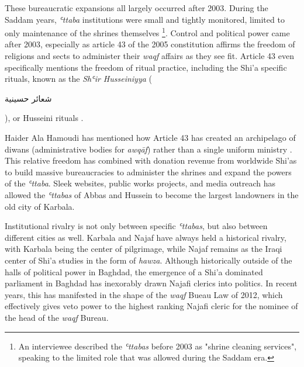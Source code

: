 These bureaucratic expansions all largely occurred after 2003. During the Saddam years, \emph{ʿttaba} institutions were small and tightly monitored, limited to only maintenance of the shrines themselves \footnote{An interviewee described the \emph{ʿttabas} before 2003 as "shrine cleaning services", speaking to the limited role that was allowed during the Saddam era.}. Control and political power came after 2003, especially as article 43 of the 2005 constitution affirms the freedom of religions and sects to administer their \emph{waqf} affairs as they see fit. Article 43 even specifically mentions the freedom of ritual practice, including the Shi'a specific rituals, known as the \emph{Shʿir Husseiniyya} (\begin{Arabic}شعائر حسينية\end{Arabic}), or Husseini rituals \cite{jawad_iraqi_2003}. 

Haider Ala Hamoudi has mentioned how Article 43 has created an archipelago of diwans (administrative bodies for \emph{awqāf}) rather than a single uniform ministry \cite[220]{hamoudi_engagements_2020}. This relative freedom has combined with donation revenue from worldwide Shi'as to build massive bureaucracies to administer the shrines and expand the powers of the \emph{ʿttaba}. Sleek websites, public works projects, and media outreach has allowed the \emph{ʿttabas} of Abbas and Hussein to become the largest landowners in the old city of Karbala. 

Institutional rivalry is not only between specific \emph{ʿttabas}, but also between different cities as well. Karbala and Najaf have always held a historical rivalry, with Karbala being the center of pilgrimage, while Najaf remains as the Iraqi center of Shi'a studies in the form of \emph{hawza}. Although historically outside of the halls of political power in Baghdad, the emergence of a Shi'a dominated parliament in Baghdad has inexorably drawn Najafi clerics into politics. In recent years, this has manifested in the shape of the \emph{waqf} Bueau Law of 2012, which effectively gives veto power to the highest ranking Najafi cleric for the nominee of the head of the \emph{waqf} Bureau. 

